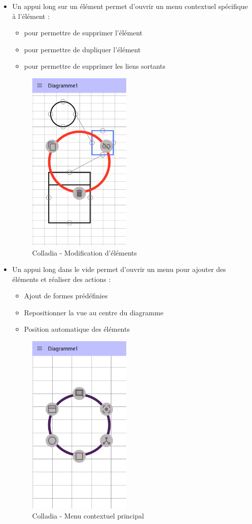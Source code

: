 \begin{itemize}
\item Un appui long sur un élément permet d'ouvrir un menu contextuel spécifique à l'élément :
\begin{itemize}
	\item pour permettre de supprimer l'élément
	\item pour permettre de dupliquer l'élément
	\item pour permettre de supprimer les liens sortants
\end{itemize}
		\begin{figure}[!h]
			\centering
			\includegraphics[width=5cm]{img/screen/new/colladia_draw_view_menu_contextuel_select}
			\caption{Colladia - Modification d'éléments}
		\end{figure}
		
		
\item Un appui long dans le vide permet d'ouvrir un menu pour ajouter des éléments et réaliser des actions :
		\begin{itemize}
			\item Ajout de formes prédéfinies
			\item Repositionner la vue au centre du diagramme
			\item Position automatique des éléments
		\end{itemize}
		\begin{figure}[!h]
			\centering
			\includegraphics[width=5cm]{img/screen/new/colladia_draw_view_menu_contextuel_main}
			\caption{Colladia - Menu contextuel principal}
		\end{figure}
		

\end{itemize}
